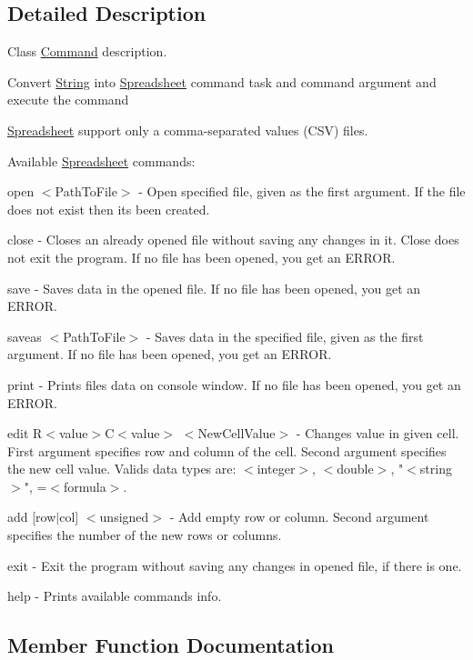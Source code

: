 \subsection{Detailed Description}
Class \hyperlink{class_command}{Command} description. 

Convert \hyperlink{class_string}{String} into \hyperlink{class_spreadsheet}{Spreadsheet} command task and command argument and execute the command



 \hyperlink{class_spreadsheet}{Spreadsheet} support only a comma-\/separated values (C\+SV) files.

Available \hyperlink{class_spreadsheet}{Spreadsheet} commands\+:
\begin{DoxyItemize}
\item open $<$\+Path\+To\+File$>$ -\/ Open specified file, given as the first argument. If the file does not exist then it\textquotesingle{}s been created.
\item close -\/ Closes an already opened file without saving any changes in it. Close does not exit the program. If no file has been opened, you get an E\+R\+R\+OR.
\item save -\/ Saves data in the opened file. If no file has been opened, you get an E\+R\+R\+OR.
\item saveas $<$\+Path\+To\+File$>$ -\/ Saves data in the specified file, given as the first argument. If no file has been opened, you get an E\+R\+R\+OR.
\item print -\/ Prints files data on console window. If no file has been opened, you get an E\+R\+R\+OR.
\item edit R$<$value$>$C$<$value$>$ $<$\+New\+Cell\+Value$>$ -\/ Changes value in given cell. First argument specifies row and column of the cell. Second argument specifies the new cell value. Valids data types are\+: $<$integer$>$, $<$double$>$, "$<$string$>$", =$<$formula$>$.
\item add \mbox{[}row$\vert$col\mbox{]} $<$unsigned$>$ -\/ Add empty row or column. Second argument specifies the number of the new rows or columns.
\item exit -\/ Exit the program without saving any changes in opened file, if there is one.
\item help -\/ Prints available commands info. 
\end{DoxyItemize}

\subsection{Member Function Documentation}
\mbox{\label{class_command_a90eaeb4bfb180ca4cafa61db2b3e0677}} 
